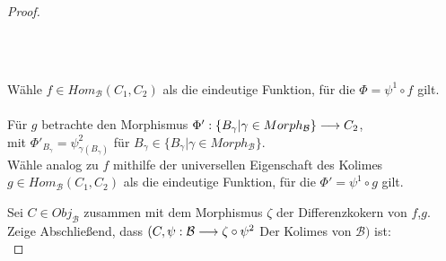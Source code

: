 \documentclass[10pt,a4paper]{report}
\newcommand{\functionfront}[3]{\nolinebreak{#1:#2 \longrightarrow #3}}
\begin{document}
\begin{proof}
\begin{center}
\ \\
\ \\
Wähle $f \in Hom_{\mathcal{B}}(C_1,C_2)$ als die eindeutige Funktion, für die $\Phi = \psi^1 \circ f$ gilt.\\
\ \\
Für $g$ betrachte den Morphismus $\functionfront{\Phi'}{\lbrace B_{\gamma} \vert \gamma \in Morph_{\mathcal{B}}\rbrace}{C_2}$,\\
mit $\Phi'_{B_{\gamma}} = \psi^2_{\gamma(B_{\gamma})}$ für $B_{\gamma} \in \lbrace B_{\gamma} \vert \gamma \in Morph_{\mathcal{B}}\rbrace$.\\
Wähle analog zu $f$ mithilfe der universellen Eigenschaft des Kolimes $g \in Hom_{\mathcal{B}}(C_1,C_2)$ als die eindeutige Funktion, für die $\Phi' = \psi^1 \circ g$ gilt.
\end{center}
Sei $C \in Obj_{\mathcal{B}}$ zusammen mit dem Morphismus $\zeta$ der Differenzkokern von $f$,$g$.\\
Zeige Abschließend, dass $(C, \functionfront{\psi}{\mathcal{B}}{\zeta \circ \psi^2}$ Der Kolimes von $\mathcal{B})$ ist:\\
\end{proof}
\end{document}
